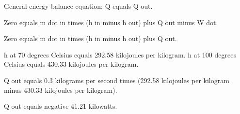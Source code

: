 General energy balance equation:  
Q equals Q out.  

Zero equals m dot in times (h in minus h out) plus Q out minus W dot.  

Zero equals m dot in times (h in minus h out) plus Q out.  

h at 70 degrees Celsius equals 292.58 kilojoules per kilogram.  
h at 100 degrees Celsius equals 430.33 kilojoules per kilogram.  

Q out equals 0.3 kilograms per second times (292.58 kilojoules per kilogram minus 430.33 kilojoules per kilogram).  

Q out equals negative 41.21 kilowatts.